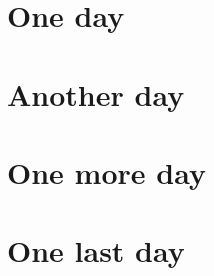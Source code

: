 \documentclass[12pt]{article}
\begin{document}
\section*{One day}

\noindent\lipsum[1]

\section*{Another day}

\noindent\lipsum[1]

\section*{One more day}

\noindent\lipsum[1]

\newpage
\section*{One last day}

\noindent\lipsum[1]
\end{document}
